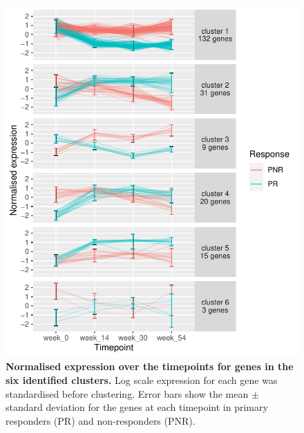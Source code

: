 \begin{figure}
    \centering
    \includegraphics[width=1.0\textwidth,page=1]{mainmatter/figures/chapter_04/plot_gene_set_enrichment.spline_cluster_trajectories.pdf}
    \caption{
        \textbf{Normalised expression over the timepoints for genes in the six identified clusters.}
        Log scale expression for each gene was standardised before clustering.
        Error bars show the mean $\pm$ standard deviation for the genes at each timepoint in primary responders (PR) and non-responders (PNR).
    }
    \label{fig:multipants_dge_spline_cluster_trajectories}
\end{figure}

